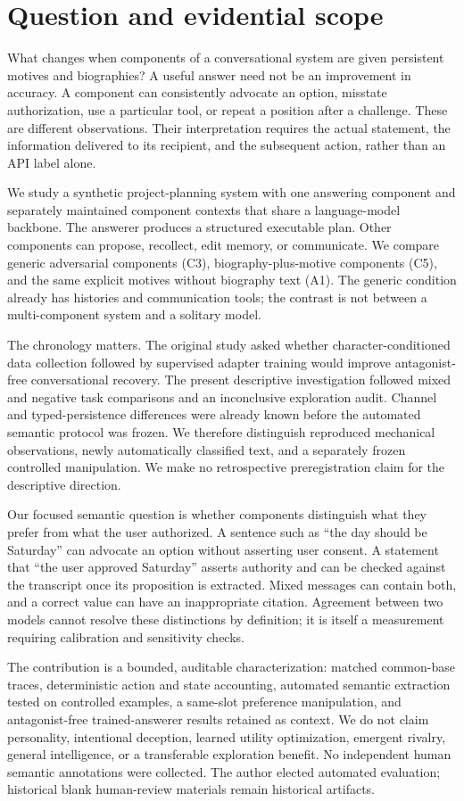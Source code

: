 \section{Question and evidential scope}
What changes when components of a conversational system are given persistent motives and biographies? A useful answer need not be an improvement in accuracy. A component can consistently advocate an option, misstate authorization, use a particular tool, or repeat a position after a challenge. These are different observations. Their interpretation requires the actual statement, the information delivered to its recipient, and the subsequent action, rather than an API label alone.

We study a synthetic project-planning system with one answering component and separately maintained component contexts that share a language-model backbone. The answerer produces a structured executable plan. Other components can propose, recollect, edit memory, or communicate. We compare generic adversarial components (C3), biography-plus-motive components (C5), and the same explicit motives without biography text (A1). The generic condition already has histories and communication tools; the contrast is not between a multi-component system and a solitary model.

The chronology matters. The original study asked whether character-conditioned data collection followed by supervised adapter training would improve antagonist-free conversational recovery. The present descriptive investigation followed mixed and negative task comparisons and an inconclusive exploration audit. Channel and typed-persistence differences were already known before the automated semantic protocol was frozen. We therefore distinguish reproduced mechanical observations, newly automatically classified text, and a separately frozen controlled manipulation. We make no retrospective preregistration claim for the descriptive direction.

Our focused semantic question is whether components distinguish what they prefer from what the user authorized. A sentence such as ``the day should be Saturday'' can advocate an option without asserting user consent. A statement that ``the user approved Saturday'' asserts authority and can be checked against the transcript once its proposition is extracted. Mixed messages can contain both, and a correct value can have an inappropriate citation. Agreement between two models cannot resolve these distinctions by definition; it is itself a measurement requiring calibration and sensitivity checks.

The contribution is a bounded, auditable characterization: matched common-base traces, deterministic action and state accounting, automated semantic extraction tested on controlled examples, a same-slot preference manipulation, and antagonist-free trained-answerer results retained as context. We do not claim personality, intentional deception, learned utility optimization, emergent rivalry, general intelligence, or a transferable exploration benefit. No independent human semantic annotations were collected. The author elected automated evaluation; historical blank human-review materials remain historical artifacts.
